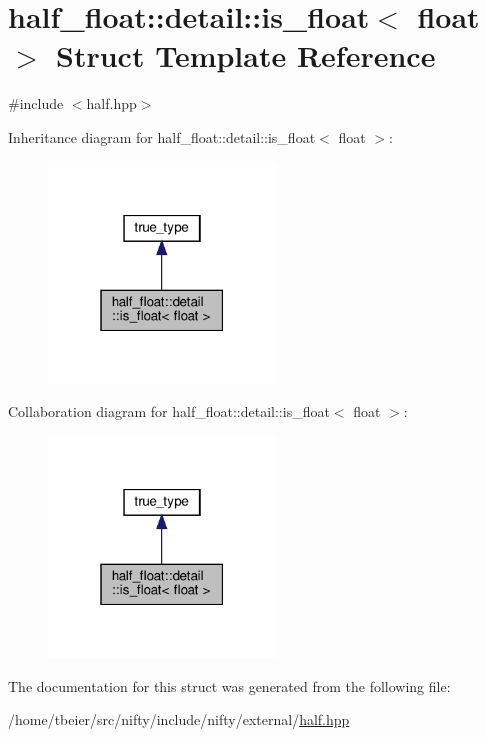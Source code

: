 \hypertarget{structhalf__float_1_1detail_1_1is__float_3_01float_01_4}{}\section{half\+\_\+float\+:\+:detail\+:\+:is\+\_\+float$<$ float $>$ Struct Template Reference}
\label{structhalf__float_1_1detail_1_1is__float_3_01float_01_4}


{\ttfamily \#include $<$half.\+hpp$>$}



Inheritance diagram for half\+\_\+float\+:\+:detail\+:\+:is\+\_\+float$<$ float $>$\+:
\nopagebreak
\begin{figure}[H]
\begin{center}
\leavevmode
\includegraphics[width=171pt]{structhalf__float_1_1detail_1_1is__float_3_01float_01_4__inherit__graph}
\end{center}
\end{figure}


Collaboration diagram for half\+\_\+float\+:\+:detail\+:\+:is\+\_\+float$<$ float $>$\+:
\nopagebreak
\begin{figure}[H]
\begin{center}
\leavevmode
\includegraphics[width=171pt]{structhalf__float_1_1detail_1_1is__float_3_01float_01_4__coll__graph}
\end{center}
\end{figure}


The documentation for this struct was generated from the following file\+:\begin{DoxyCompactItemize}
\item 
/home/tbeier/src/nifty/include/nifty/external/\hyperlink{half_8hpp}{half.\+hpp}\end{DoxyCompactItemize}
